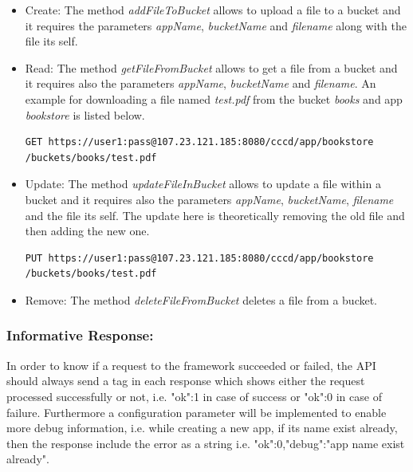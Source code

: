 \begin{itemize}
\item {Create:} The method \textit{addFileToBucket} allows to upload a file to a bucket and it requires the parameters \textit{appName}, \textit{bucketName} and \textit{filename} along with the file its self.

\item {Read:} The method \textit{getFileFromBucket} allows to get a file from a bucket and it requires also the parameters \textit{appName}, \textit{bucketName} and \textit{filename}.  An example for downloading a file named \textit{test.pdf} from the bucket \textit{books} and app \textit{bookstore} is listed below.

\begin{code}
\begin{verbatim}
GET https://user1:pass@107.23.121.185:8080/cccd/app/bookstore
/buckets/books/test.pdf
\end{verbatim}
\end{code}

\item {Update:} The method \textit{updateFileInBucket} allows to update a file within a bucket and it requires also the parameters \textit{appName}, \textit{bucketName}, \textit{filename} and the file its self.  The update here is theoretically removing the old file and then adding the new one.
\begin{code}
\begin{verbatim}
PUT https://user1:pass@107.23.121.185:8080/cccd/app/bookstore
/buckets/books/test.pdf
\end{verbatim}
\end{code}

\item {Remove:} The method \textit{deleteFileFromBucket} deletes a file from a bucket.

\end{itemize}





\subsubsection{Informative Response:} In order to know if a request to the framework succeeded or failed, the \ac{API} should always send a tag in each response which shows either the request processed successfully or not, i.e. {"ok":1} in case of success or {"ok":0} in case of failure. Furthermore a configuration parameter will be implemented to enable more debug information, i.e. while creating a new app, if its name exist already, then the response include the error as a string i.e. {"ok":0,"debug":"app name exist already"}.

